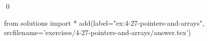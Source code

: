 
\begin{ex}
  \label{ex:4-27-pointers-and-arrays}
  
  \qed
\end{ex}
\begin{python0}
from solutions import *
add(label="ex:4-27-pointers-and-arrays",
    srcfilename='exercises/4-27-pointers-and-arrays/answer.tex')
\end{python0}
